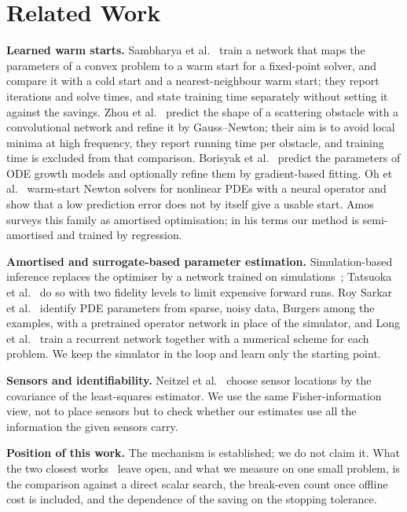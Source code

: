 \section{Related Work}
\textbf{Learned warm starts.} Sambharya et al.~\cite{sambharya2024} train a network that maps the parameters
of a convex problem to a warm start for a fixed-point solver, and compare it with a cold start and a
nearest-neighbour warm start; they report iterations and solve times, and state training time separately
without setting it against the savings. Zhou et al.~\cite{zhou2023} predict the shape of a scattering
obstacle with a convolutional network and refine it by Gauss--Newton; their aim is to avoid local minima at
high frequency, they report running time per obstacle, and training time is excluded from that comparison.
Borisyak et al.~\cite{borisyak2023} predict the parameters of ODE growth models and optionally refine them by
gradient-based fitting. Oh et al.~\cite{oh2026} warm-start Newton solvers for nonlinear PDEs with a neural
operator and show that a low prediction error does not by itself give a usable start. Amos~\cite{amos2023}
surveys this family as amortised optimisation; in his terms our method is semi-amortised and trained by
regression.

\textbf{Amortised and surrogate-based parameter estimation.} Simulation-based inference replaces the
optimiser by a network trained on simulations~\cite{cranmer2020}; Tatsuoka et al.~\cite{tatsuoka2025} do so
with two fidelity levels to limit expensive forward runs. Roy Sarkar et al.~\cite{roysarkar2024} identify PDE
parameters from sparse, noisy data, Burgers among the examples, with a pretrained operator network in place
of the simulator, and Long et al.~\cite{long2025} train a recurrent network together with a numerical scheme
for each problem. We keep the simulator in the loop and learn only the starting point.

\textbf{Sensors and identifiability.} Neitzel et al.~\cite{neitzel2019} choose sensor locations by the
covariance of the least-squares estimator. We use the same Fisher-information view, not to place sensors but
to check whether our estimates use all the information the given sensors carry.

\textbf{Position of this work.} The mechanism is established; we do not claim it. What the two closest
works~\cite{sambharya2024,zhou2023} leave open, and what we measure on one small problem, is the comparison
against a direct scalar search, the break-even count once offline cost is included, and the dependence of the
saving on the stopping tolerance.

